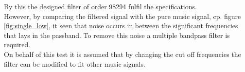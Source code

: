 By this the designed filter of order 98294 fulfil the specifications.\\
However, by comparing the filtered signal with the pure music signal, cp. figure \ref{fig:single_low}, it seen that noise occurs in between the significant frequencies that lays in the passband. To remove this noise a multiple bandpass filter is required. \\
On behalf of this test it is assumed that by changing the cut off frequencies the filter can be modified to fit other music signals.  